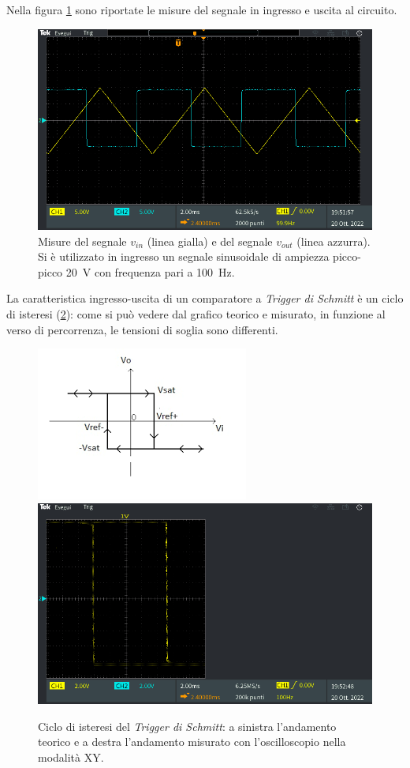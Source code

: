 \noindent
Nella figura \ref{fig:uscita_circuito_2} sono riportate le misure del segnale in ingresso e uscita al circuito.
\begin{figure}[tbh]
	\centering
	\includegraphics[width=\linewidth]{./ImageFiles/Laboratorio 3/TEK00007.PNG}
	\caption{Misure del segnale $v_{in}$ (linea gialla) e del segnale $v_{out}$ (linea azzurra). Si è utilizzato in ingresso un segnale sinusoidale di ampiezza picco-picco \SI{20}{\volt} con frequenza pari a \SI{100}{\hertz}.}
	\label{fig:uscita_circuito_2}
\end{figure}

\noindent
La caratteristica ingresso-uscita di un comparatore a \textit{Trigger di Schmitt} è un ciclo di isteresi (\Fig\ref{fig:ciclo_isteresi}): come si può vedere dal grafico teorico e misurato, in funzione al verso di percorrenza, le tensioni di soglia sono differenti. 
\begin{figure}[h!]
	\centering
	\includegraphics[width=0.4\linewidth]{./ImageFiles/Laboratorio 3/Ciclo di Isteresi.png}
	\includegraphics[width=0.5\linewidth]{./ImageFiles/Laboratorio 3/TEK00008.PNG}
	\caption{Ciclo di isteresi del \textit{Trigger di Schmitt}: a sinistra l'andamento teorico e a destra l'andamento misurato con l'oscilloscopio nella modalità XY.}
	\label{fig:ciclo_isteresi}
\end{figure} 


